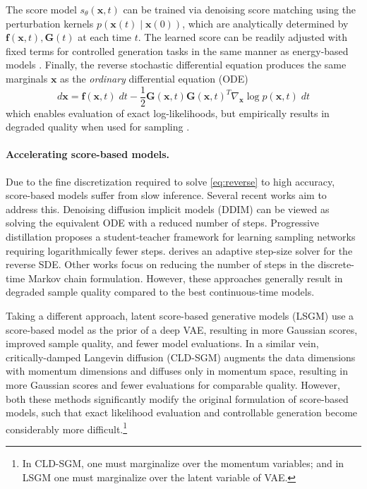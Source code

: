 \documentclass{article}
\begin{document}
The score model $s_\theta(\mathbf{x}, t)$ can be trained via denoising score matching \cite{song2019generative} using the perturbation kernels $p(\mathbf{x}(t) \mid \mathbf{x}(0))$, which are analytically determined by $\mathbf{f}(\mathbf{x}, t), \mathbf{G}(t)$ at each time $t$. The learned score can be readily adjusted with fixed terms for controlled generation tasks in the same manner as energy-based models \cite{du2019implicit}. Finally, the reverse stochastic differential equation produces the same marginals $\mathbf{x}$ as the \emph{ordinary} differential equation (ODE)
\begin{equation} \label{eq:ode}
    d\mathbf{x} = \mathbf{f}(\mathbf{x}, t)\;dt - \frac{1}{2}\mathbf{G}(\mathbf{x}, t)\mathbf{G}(\mathbf{x}, t)^T\nabla_\mathbf{x} \log p(\mathbf{x}, t) \; dt 
\end{equation}
which enables evaluation of exact log-likelihoods, but empirically results in degraded quality when used for sampling \cite{song2021score}.

\paragraph{\textbf{Accelerating score-based models.}} Due to the fine discretization required to solve \eqref{eq:reverse} to high accuracy, score-based models suffer from slow inference. Several recent works aim to address this. Denoising diffusion implicit models (DDIM) \cite{song2020denoising} can be viewed as solving the equivalent ODE with a reduced number of steps. Progressive distillation \cite{salimans2021progressive} proposes a student-teacher framework for learning sampling networks requiring logarithmically fewer steps. \cite{jolicoeur2021gotta} derives an adaptive step-size solver for the reverse SDE. Other works \cite{nichol2021improved,dhariwal2021diffusion,kong2021fast,watson2021learning,san2021noise,lam2021bilateral,bao2022analytic} focus on reducing the number of steps in the discrete-time Markov chain formulation. However, these approaches generally result in degraded sample quality compared to the best continuous-time models.

Taking a different approach, latent score-based generative models (LSGM) \cite{vahdat2021score} use a score-based model as the prior of a deep VAE, resulting in more Gaussian scores, improved sample quality, and fewer model evaluations. In a similar vein, critically-damped Langevin diffusion (CLD-SGM) \cite{dockhorn2021score} augments the data dimensions with momentum dimensions and diffuses only in momentum space, resulting in more Gaussian scores and fewer evaluations for comparable quality. However, both these methods significantly modify the original formulation of score-based models, such that exact likelihood evaluation and controllable generation become considerably more difficult.\footnote{In CLD-SGM, one must marginalize over the momentum variables; and in LSGM one must marginalize over the latent variable of VAE.}
\end{document}
